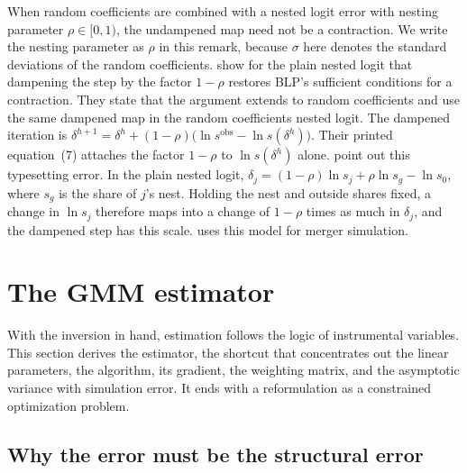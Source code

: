 \begin{remark}\label{rem:08-rcnl}
When random coefficients are combined with a nested logit error with nesting parameter $\rho \in [0,1)$, the
undampened map need not be a contraction. We write the nesting parameter as $\rho$ in this remark, because
$\sigma$ here denotes the standard deviations of the random coefficients.
\citet[pp.~919 and 934--935]{GrigolonVerboven2014} show for the plain nested logit that dampening the step by the
factor $1 - \rho$ restores BLP's sufficient conditions for a contraction. They state that the argument extends to
random coefficients and use the same dampened map in the random coefficients nested logit. The
dampened iteration is $\delta^{h+1} = \delta^h + (1 - \rho)\big(\ln s^{\text{obs}} - \ln s(\delta^h)\big)$. Their
printed equation~(7) attaches the factor $1 - \rho$ to $\ln s(\delta^h)$ alone. \citet[eq.~15 and n.~20]{ConlonGortmaker2020}
point out this typesetting error. In the plain nested logit, $\delta_j
= (1 - \rho)\ln s_j + \rho\ln s_g - \ln s_0$, where $s_g$ is the share of $j$'s nest. Holding the nest and
outside shares fixed, a change in $\ln s_j$ therefore maps into a change of $1 - \rho$ times as much in
$\delta_j$, and the dampened step has this scale.  uses this model for merger simulation.
\end{remark}

\section{The GMM estimator}\label{sec:08-gmm}

With the inversion in hand, estimation follows the logic of instrumental variables. This section derives the
estimator, the shortcut that concentrates out the linear parameters, the algorithm, its gradient, the
weighting matrix, and the asymptotic variance with simulation error. It ends with a reformulation as a
constrained optimization problem.

\subsection{Why the error must be the structural error}\label{sec:08-why-xi}

